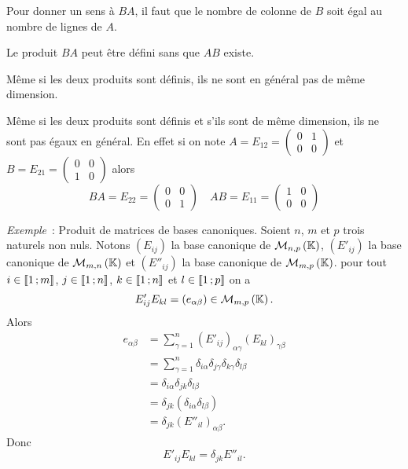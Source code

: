\danger Pour donner un sens à \(BA\), il faut que le nombre de colonne de \(B\) soit égal au nombre de lignes de \(A\).

\danger Le produit \(BA\) peut être défini sans que \(AB\) existe.

\danger Même si les deux produits sont définis, ils ne sont en général pas de même dimension.

\danger Même si les deux produits sont définis et s'ils sont de même dimension, ils ne sont pas égaux en général. En effet si on note \(A=E_{12}=\begin{pmatrix} 0 & 1 \\ 0 & 0 \end{pmatrix}\) et \(B=E_{21}=\begin{pmatrix} 0 & 0 \\ 1 & 0 \end{pmatrix}\) alors
\begin{equation}
  BA = E_{22} = \begin{pmatrix} 0 & 0 \\ 0 & 1 \end{pmatrix} \quad AB = E_{11} = \begin{pmatrix} 1 & 0 \\ 0 & 0 \end{pmatrix}
\end{equation}


\emph{Exemple}~: Produit de matrices de bases canoniques. Soient \(n\), \(m\) et \(p\) trois naturels non nuls. Notons \((E_{ij})\) la base canonique de \(\mathcal{M}_{n,p}\left(\mathbb{K}\right)\), \((E'_{ij})\) la base canonique de \(\mathcal{M}_{m,n}\left(\mathbb{K}\right)\) et \((E''_{ij})\) la base canonique de \(\mathcal{M}_{m,p}\left(\mathbb{K}\right)\). pour tout \(i \in \mathopen{\llbracket}1\mathclose{}\mathpunct{};m\mathclose{\rrbracket}\), \(j \in \mathopen{\llbracket}1\mathclose{}\mathpunct{};n\mathclose{\rrbracket}\), \(k \in \mathopen{\llbracket}1\mathclose{}\mathpunct{};n\mathclose{\rrbracket}\) et \(l \in \mathopen{\llbracket}1\mathclose{}\mathpunct{};p\mathclose{\rrbracket}\) on a
\begin{equation}
  E'_{ij} E_{kl} =(e_{\alpha \beta}) \in \mathcal{M}_{m,p}\left(\mathbb{K}\right).
\end{equation}
Alors
\begin{align}
  e_{\alpha \beta} &=\sum_{\gamma=1}^n (E'_{ij})_{\alpha \gamma} (E_{kl})_{\gamma \beta}\\
                   &=\sum_{\gamma=1}^n \delta_{i\alpha} \delta_{j\gamma} \delta_{k\gamma} \delta_{l\beta} \\
                   &= \delta_{i\alpha} \delta_{jk} \delta_{l\beta}\\
                   &= \delta_{jk} (\delta_{i\alpha} \delta_{l\beta})\\
                   &= \delta_{jk} (E''_{il})_{\alpha\beta}.
\end{align}
Donc
\begin{equation}
  E'_{ij} E_{kl} = \delta_{jk} E''_{il}.
\end{equation}

